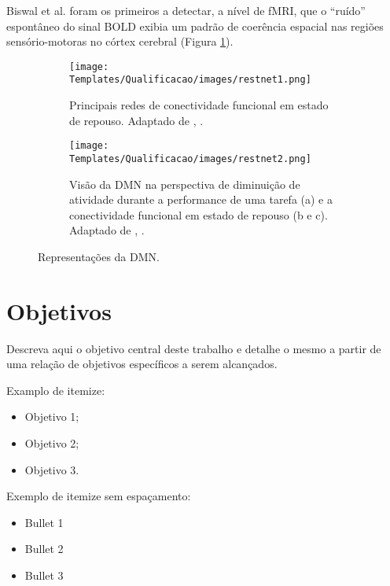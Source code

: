 \documentclass[11pt]{article}
\begin{document}
Biswal et al. \citep{biswal1995}  foram os primeiros a detectar, a nível de fMRI, que o “ruído” espontâneo do sinal BOLD exibia um padrão de coerência espacial nas regiões sensório-motoras no córtex cerebral (Figura \ref{f:restnet1}).

\begin{figure}[!htb]
    \centering
    \begin{subfigure}[b]{0.4\linewidth}        %
        \centering
        \texttt{[image: Templates/Qualificacao/images/restnet1.png]}
        \caption{Principais redes de conectividade funcional em estado de repouso. Adaptado de \citeauthor{Raichle2011}, \citeyear{Raichle2011}.}
        \label{f:restnet1}
    \end{subfigure}\hfill
    \begin{subfigure}[b]{0.4\linewidth}        %
        \centering
        \texttt{[image: Templates/Qualificacao/images/restnet2.png]}
        \caption{Visão da DMN na perspectiva de diminuição de atividade durante a performance de uma tarefa (a) e a conectividade funcional em estado de repouso (b e c). Adaptado de \citeauthor{Raichle2015}, \citeyear{Raichle2015}.}
        \label{f:restnet2}
    \end{subfigure}
    \caption{Representações da DMN. }
    \label{f:restnet}
\end{figure}

\section{Objetivos} \label{ch:objetivos}

Descreva aqui o objetivo central deste trabalho e detalhe o mesmo a partir de uma relação de objetivos específicos a serem alcançados.

Examplo de itemize:

\begin{itemize}

\item Objetivo 1;

\item Objetivo 2;

\item Objetivo 3.

\end{itemize}

Exemplo de itemize sem espaçamento:

\begin{itemize}
\vskip0.2cm
\item Bullet 1
\item Bullet 2
\item Bullet 3
\end{itemize}
\end{document}
